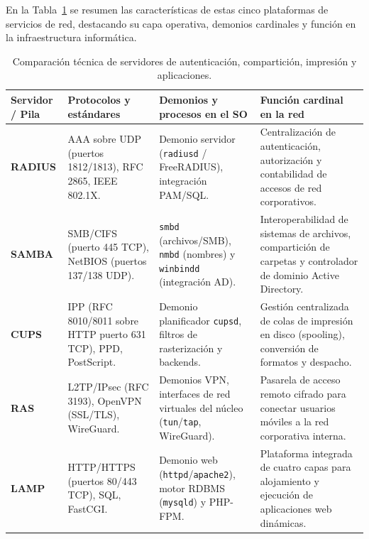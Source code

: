 \documentclass[12pt]{article}
\begin{document}
En la Tabla~\ref{tab:comparativaServidoresAplicaciones} se resumen las características de estas cinco plataformas de servicios de red, destacando su capa operativa, demonios cardinales y función en la infraestructura informática.

\begin{table}[H]
\centering
\small
\renewcommand{\arraystretch}{1.15}
\renewcommand{\tabularxcolumn}[1]{m{#1}}
\setlength{\emergencystretch}{1.5em}
\caption{Comparación técnica de servidores de autenticación, compartición, impresión y aplicaciones.}
\label{tab:comparativaServidoresAplicaciones}
\begin{tabularx}{\textwidth}{>{\centering\arraybackslash}m{2.3cm} X X X}
\toprule
\textbf{Servidor / Pila} & \textbf{Protocolos y estándares} & \textbf{Demonios y procesos en el SO} & \textbf{Función cardinal en la red} \\
\midrule
\textbf{RADIUS} & AAA sobre UDP (puertos 1812/1813), RFC 2865, IEEE 802.1X. & Demonio servidor (\texttt{radiusd} / FreeRADIUS), integración PAM/SQL. & Centralización de autenticación, autorización y contabilidad de accesos de red corporativos. \\
\addlinespace
\textbf{SAMBA} & SMB/CIFS (puerto 445 TCP), NetBIOS (puertos 137/138 UDP). & \texttt{smbd} (archivos/SMB), \texttt{nmbd} (nombres) y \texttt{winbindd} (integración AD). & Interoperabilidad de sistemas de archivos, compartición de carpetas y controlador de dominio Active Directory. \\
\addlinespace
\textbf{CUPS} & IPP (RFC 8010/8011 sobre HTTP puerto 631 TCP), PPD, PostScript. & Demonio planificador \texttt{cupsd}, filtros de rasterización y backends. & Gestión centralizada de colas de impresión en disco (spooling), conversión de formatos y despacho. \\
\addlinespace
\textbf{RAS} & L2TP/IPsec (RFC 3193), OpenVPN (SSL/TLS), WireGuard. & Demonios VPN, interfaces de red virtuales del núcleo (\texttt{tun}/\texttt{tap}, WireGuard). & Pasarela de acceso remoto cifrado para conectar usuarios móviles a la red corporativa interna. \\
\addlinespace
\textbf{LAMP} & HTTP/HTTPS (puertos 80/443 TCP), SQL, FastCGI. & Demonio web (\texttt{httpd}/\texttt{apache2}), motor RDBMS (\texttt{mysqld}) y PHP-FPM. & Plataforma integrada de cuatro capas para alojamiento y ejecución de aplicaciones web dinámicas. \\
\bottomrule
\end{tabularx}
\end{table}
\end{document}
